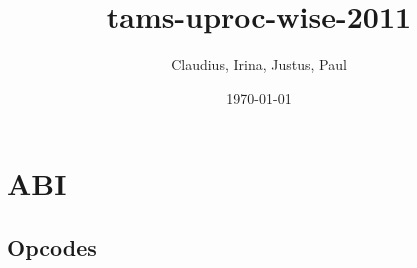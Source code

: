 \documentclass{article}
\author{Claudius, Irina, Justus, Paul}
\title{tams-uproc-wise-2011}
\date{\today}
\begin{document}
\maketitle

\section{ABI}
\subsection{Opcodes}


\end{document}
